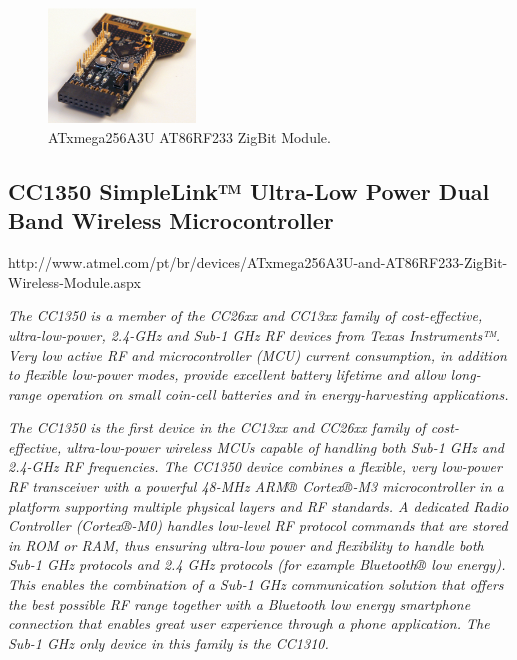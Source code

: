 \begin{figure}[h!]
	\centering
	\includegraphics[width=0.35\textwidth,keepaspectratio]{figures/atxmega}
	\caption{ATxmega256A3U AT86RF233 ZigBit Module.}
	
\end{figure}


\subsection{CC1350 SimpleLink™ Ultra-Low Power Dual Band Wireless Microcontroller}

\begin{framed}
	
	http://www.atmel.com/pt/br/devices/ATxmega256A3U-and-AT86RF233-ZigBit-Wireless-Module.aspx
	
	\vspace{1em}
	\vspace{1em}
\small	
	\textit{The CC1350 is a member of the CC26xx and CC13xx family of cost-effective, ultra-low-power, 2.4-GHz and Sub-1 GHz RF devices from Texas Instruments™. Very low active RF and microcontroller (MCU) current consumption, in addition to flexible low-power modes, provide excellent battery lifetime and allow long-range operation on small coin-cell batteries and in energy-harvesting applications.}
		
		\textit{The CC1350 is the first device in the CC13xx and CC26xx family of cost-effective, ultra-low-power wireless MCUs capable of handling both Sub-1 GHz and 2.4-GHz RF frequencies. The CC1350 device combines a flexible, very low-power RF transceiver with a powerful 48-MHz ARM® Cortex®-M3 microcontroller in a platform supporting multiple physical layers and RF standards. A dedicated Radio Controller (Cortex®-M0) handles low-level RF protocol commands that are stored in ROM or RAM, thus ensuring ultra-low power and flexibility to handle both Sub-1 GHz protocols and 2.4 GHz protocols (for example Bluetooth® low energy). This enables the combination of a Sub-1 GHz communication solution that offers the best possible RF range together with a Bluetooth low energy smartphone connection that enables great user experience through a phone application. The Sub-1 GHz only device in this family is the CC1310.}
\end{framed}

